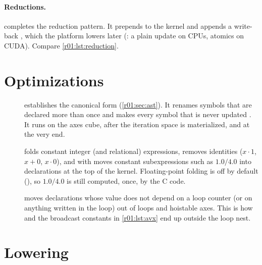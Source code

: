 \paragraph{Reductions.}
 completes the reduction pattern. It prepends
 to the kernel and appends a write-back
, which the platform lowers later
(: a plain update on CPUs, atomics on CUDA). Compare
\cref{r01:lst:reduction}.

\section{Optimizations}

\begin{description}
  \item[] establishes the canonical form (\cref{r01:sec:ast}). It
    renames symbols that are declared more than once and makes every symbol that is never
    updated . It runs on the axes cube, after the iteration space is
    materialized, and at the very end.
  \item[] folds constant integer (and relational) expressions,
    removes identities ($x\cdot 1$, $x+0$, $x\cdot 0$), and with
     moves constant subexpressions such as
    $1.0/4.0$ into declarations  at the top of the kernel. Floating-point
    folding is off by default (), so $1.0/4.0$ is still
    computed, once, by the C code.
  \item[] moves declarations whose value does
    not depend on a loop counter (or on anything written in the loop) out of loops and
    hoistable axes. This is how  and the broadcast constants in
    \cref{r01:lst:avx} end up outside the loop nest.
\end{description}

\section{Lowering}

